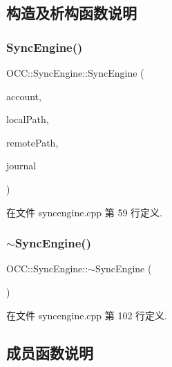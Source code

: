 \subsection{构造及析构函数说明}
\mbox{\label{class_o_c_c_1_1_sync_engine_a2c11f89112096e9b5c0c900bfd3559a1}} 
\subsubsection{\texorpdfstring{Sync\+Engine()}{SyncEngine()}}
{\footnotesize\ttfamily O\+C\+C\+::\+Sync\+Engine\+::\+Sync\+Engine (\begin{DoxyParamCaption}\item[{\hyperlink{namespace_o_c_c_a848616aedb9188e223c6b9867757fe69}{Account\+Ptr}}]{account,  }\item[{const Q\+String \&}]{local\+Path,  }\item[{const Q\+String \&}]{remote\+Path,  }\item[{\hyperlink{class_o_c_c_1_1_sync_journal_db}{O\+C\+C\+::\+Sync\+Journal\+Db} $\ast$}]{journal }\end{DoxyParamCaption})}



在文件 syncengine.\+cpp 第 59 行定义.

\mbox{\label{class_o_c_c_1_1_sync_engine_afb126d8c09b84b002a91a1e7c9ef0b37}} 
\subsubsection{\texorpdfstring{$\sim$\+Sync\+Engine()}{~SyncEngine()}}
{\footnotesize\ttfamily O\+C\+C\+::\+Sync\+Engine\+::$\sim$\+Sync\+Engine (\begin{DoxyParamCaption}{ }\end{DoxyParamCaption})}



在文件 syncengine.\+cpp 第 102 行定义.



\subsection{成员函数说明}
\mbox{\label{class_o_c_c_1_1_sync_engine_aa6750dc1acc1929b6ca7e9fb9511b095}} 
